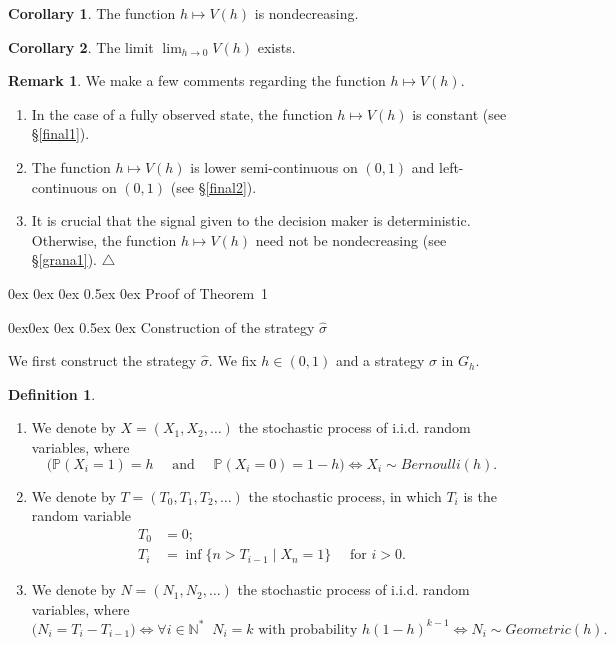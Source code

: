 \documentclass[english,openary,11pt]{article}
\makeatletter
\renewcommand\section{\@startsection {section}{1}{\z@}%
                                   {0ex \@plus 0ex \@minus 0ex}%
                                   {0.5ex \@plus0ex}%
                                   {\normalfont\LARGE\bfseries}}%
\renewcommand\subsection{\@startsection{subsection}{2}{\z@}%
                                     {0ex\@plus 0ex \@minus 0ex}%
                                     {0.5ex \@plus 0ex}%
                                     {\normalfont\Large\bfseries}}%
\newcommand\xqed[1]{%
  \leavevmode\unskip\penalty9999 \hbox{}\nobreak\hfill
  \quad\hbox{#1}}
\newcommand\demo{\xqed{$\triangle$}}
\newcommand{\demoo}{\tag*{$\triangle$}}
\theoremstyle{definition}
\newtheorem{remark}{Remark}
\newtheorem{definition}{Definition}
\newtheorem{corollary}{Corollary}
\newcommand{\N}{\mathbb{N}}
\renewcommand{\P}{\mathbb{P}}
\makeatother
\begin{document}
\begin{corollary} The function $h \mapsto V(h)$ is nondecreasing.
\label{corollary2}
\end{corollary}

\begin{corollary} The limit $\lim_{h \to 0} V(h)$ exists.
\label{corollary3}
\end{corollary}

\begin{remark} We make a few comments regarding the function $h \mapsto V(h)$.
\begin{enumerate}
	\item In the case of a fully observed state, the function $h \mapsto V(h)$ is constant (see \S\ref{final1}).
	\item The function $h \mapsto V(h)$ is lower semi-continuous on $(0,1)$ and left-continuous on $(0,1)$ (see \S\ref{final2}).
	\item It is crucial that the signal given to the decision maker is deterministic. Otherwise, the function $h \mapsto V(h)$ need not be nondecreasing (see \S\ref{grana1}). \demo
\end{enumerate}

\end{remark}

\section{Proof of Theorem~1}

\subsection{Construction of the strategy $\widehat \sigma$}

We first construct the strategy $\widehat \sigma$. We fix $h \in (0,1)$ and a strategy $\sigma$ in $G_h$.

\begin{definition} \leavevmode
\begin{enumerate}
\item We denote by $X = (X_1, X_2, \ldots)$ the stochastic process of i.i.d. random variables, where 
$$\Big(\P(X_i = 1) = h \quad \text{ and } \quad \P(X_i = 0) = 1 - h \Big) \iff X_i \sim Bernoulli(h).$$
\item We denote by $T = (T_0, T_1, T_2, \ldots)$ the stochastic process, in which $T_i$ is the random variable
\begin{align*}
	T_0 &= 0; \\
	T_i &= \inf\{n > T_{i - 1} \mid X_n = 1\} \quad \text{ for } i>0.
\end{align*}
\item We denote by $N = (N_1, N_2, \ldots)$ the stochastic process of i.i.d. random variables, where 
\[ \Big(N_i = T_i - T_{i-1}\Big) \iff \forall i \in \N^* \;\; N_i = k \text{ with probability } h (1-h)^{k-1} \iff N_i \sim Geometric(h). \demoo \]
\end{enumerate}
\end{definition}
\end{document}
